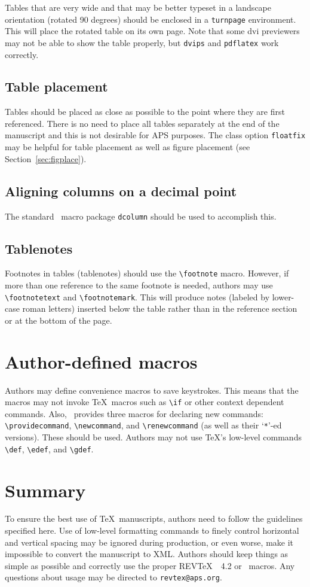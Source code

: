 \documentclass[twocolumn,secnumarabic,amssymb, nobibnotes, aps, prd]{revtex4-2}
\newcommand{\revtex}{REV\TeX\ }
\newcommand{\classoption}[1]{\texttt{#1}}
\newcommand{\macro}[1]{\texttt{\textbackslash#1}}
\newcommand{\m}[1]{\macro{#1}}
\newcommand{\env}[1]{\texttt{#1}}
\begin{document}
Tables that are very wide and that may be better typeset in a
landscape orientation (rotated 90 degrees) should be enclosed in a
\env{turnpage} environment. This will place the rotated table on its own
page. Note that some dvi previewers may not be able to show the table
properly, but \texttt{dvips} and \texttt{pdflatex} work correctly.

\subsection{Table placement}
Tables should be placed as close as possible to the point where they
are first referenced. There is no need to place all tables separately
at the end of the manuscript and this is not desirable for APS
purposes. The class option \classoption{floatfix} may be helpful for
table placement as well as figure placement (see Section~\ref{sec:figplace}).

\subsection{Aligning columns on a decimal point}
The standard \LaTeXe\ macro package \classoption{dcolumn} should be
used to accomplish this.

\subsection{Tablenotes}
\label{sec:tablenotes}
Footnotes in tables (tablenotes) should use the \m{footnote}
macro. However, if more than one reference to the same footnote is
needed, authors may use \m{footnotetext} and \m{footnotemark}. This
will produce notes (labeled by lower-case roman letters) inserted
below the table rather than in the reference section or at the bottom
of the page.


\section{Author-defined macros}
Authors may define convenience macros to save keystrokes. This means
that the macros may not invoke \TeX\ macros such as \m{if} or other
context dependent commands. Also, \LaTeXe\ provides three macros for
declaring new commands: \m{providecommand}, \m{newcommand}, and
\m{renewcommand} (as well as their `\verb+*+'-ed versions). These
should be used. Authors may not use \TeX\relax's low-level commands
\m{def}, \m{edef}, and \m{gdef}.

\section{Summary}
To ensure the best use of \TeX\ manuscripts, authors need to follow
the guidelines specified here. Use of low-level formatting commands to
finely control horizontal and vertical spacing may be ignored during
production, or even worse, make it impossible to convert the
manuscript to XML. Authors should keep
things as simple as possible and correctly use the proper \revtex~4.2
or \LaTeXe\ macros. Any questions about usage may be directed to
\texttt{revtex@aps.org}.
\end{document}
